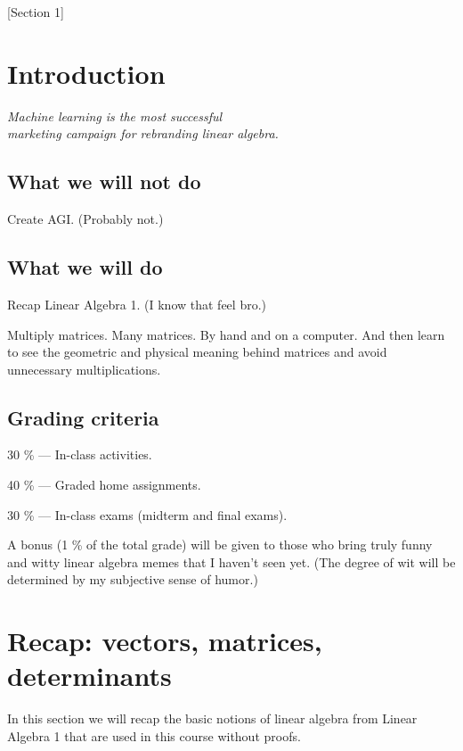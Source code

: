 [Section 1]
    
\newpage

\section{Introduction}

\begin{flushright}
    \emph{Machine learning is the most successful\\
    marketing campaign for rebranding linear algebra.}
    \end{flushright}

\subsection{What we will not do}
Create AGI. (Probably not.)

\subsection{What we will do}

Recap Linear Algebra 1. (I know that feel bro.)

Multiply matrices. Many matrices. By hand and on a computer. And then learn to see the geometric and physical meaning behind matrices and avoid unnecessary multiplications.

\subsection{Grading criteria}

\hspace{\parindent}30 \% --- In-class activities.

40 \% --- Graded home assignments.

30 \% --- In-class exams (midterm and final exams).

A bonus (1 \% of the total grade) will be given to those who bring truly funny and witty linear algebra memes that I haven't seen yet. (The degree of wit will be determined by my subjective sense of humor.)

\newpage
\section{Recap: vectors, matrices, determinants}
In this section we will recap the basic notions of linear algebra from Linear Algebra 1 that are used in this course without proofs.

